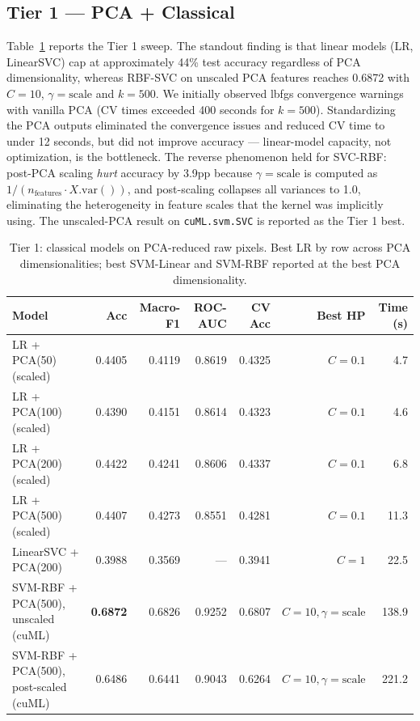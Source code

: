 \documentclass[10pt,letterpaper]{article}
\begin{document}
\subsection{Tier 1 --- PCA + Classical}
\label{sec:results-tier1}
Table~\ref{tab:tier1} reports the Tier 1 sweep. The standout finding is that linear models (LR, LinearSVC) cap at approximately 44\% test accuracy regardless of PCA dimensionality, whereas RBF-SVC on unscaled PCA features reaches 0.6872 with $C{=}10$, $\gamma{=}\text{scale}$ and $k{=}500$. We initially observed lbfgs convergence warnings with vanilla PCA (CV times exceeded 400 seconds for $k{=}500$). Standardizing the PCA outputs eliminated the convergence issues and reduced CV time to under 12 seconds, but did not improve accuracy --- linear-model capacity, not optimization, is the bottleneck. The reverse phenomenon held for SVC-RBF: post-PCA scaling \emph{hurt} accuracy by 3.9pp because $\gamma{=}\text{scale}$ is computed as $1 / (n_\text{features} \cdot X.\!\text{var}())$, and post-scaling collapses all variances to 1.0, eliminating the heterogeneity in feature scales that the kernel was implicitly using. The unscaled-PCA result on \texttt{cuML.svm.SVC} is reported as the Tier 1 best.

\begin{table}[h]
\centering
\small
\caption{Tier 1: classical models on PCA-reduced raw pixels. Best LR by row across PCA dimensionalities; best SVM-Linear and SVM-RBF reported at the best PCA dimensionality.}
\label{tab:tier1}
\begin{tabular}{lrrrrrr}
\toprule
\textbf{Model} & \textbf{Acc} & \textbf{Macro-F1} & \textbf{ROC-AUC} & \textbf{CV Acc} & \textbf{Best HP} & \textbf{Time (s)} \\
\midrule
LR + PCA(50) (scaled) & 0.4405 & 0.4119 & 0.8619 & 0.4325 & $C{=}0.1$ & 4.7 \\
LR + PCA(100) (scaled) & 0.4390 & 0.4151 & 0.8614 & 0.4323 & $C{=}0.1$ & 4.6 \\
LR + PCA(200) (scaled) & 0.4422 & 0.4241 & 0.8606 & 0.4337 & $C{=}0.1$ & 6.8 \\
LR + PCA(500) (scaled) & 0.4407 & 0.4273 & 0.8551 & 0.4281 & $C{=}0.1$ & 11.3 \\
LinearSVC + PCA(200) & 0.3988 & 0.3569 & --- & 0.3941 & $C{=}1$ & 22.5 \\
SVM-RBF + PCA(500), unscaled (cuML) & \textbf{0.6872} & 0.6826 & 0.9252 & 0.6807 & $C{=}10, \gamma{=}\text{scale}$ & 138.9 \\
SVM-RBF + PCA(500), post-scaled (cuML) & 0.6486 & 0.6441 & 0.9043 & 0.6264 & $C{=}10, \gamma{=}\text{scale}$ & 221.2 \\
\bottomrule
\end{tabular}
\end{table}
\end{document}
